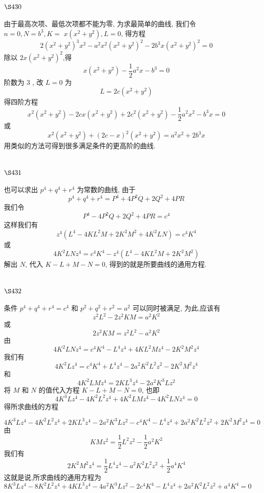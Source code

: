 \section{$\S 430$}

由于最高次项、最低次项都不能为零, 为求最简单的曲线, 我们令 $n=0, N=b^{3}, K=$ $x\left(x^{2}+y^{2}\right), L=0$, 得方程
\[
2\left(x^{2}+y^{2}\right)^{3} x^{2}-a^{2} x^{2}\left(x^{2}+y^{2}\right)^{2}-2 b^{3} x\left(x^{2}+y^{2}\right)^{2}=0
\]
除以 $2 x\left(x^{2}+y^{2}\right)^{2}$,得
\[
x\left(x^{2}+y^{2}\right)-\frac{1}{2} a^{2} x-b^{3}=0
\]
阶数为 3 , 改 $L=0$ 为
\[
L=2 c\left(x^{2}+y^{2}\right)
\]
得四阶方程
\[
x^{2}\left(x^{2}+y^{2}\right)-2 c x\left(x^{2}+y^{2}\right)+2 c^{2}\left(x^{2}+y^{2}\right)-\frac{1}{2} a^{2} x^{2}-b^{3} x=0
\]
或
\[
x^{2}\left(x^{2}+y^{2}\right)+(2 c-x)^{2}\left(x^{2}+y^{2}\right)=a^{2} x^{2}+2 b^{3} x
\]
用类似的方法可得到很多满足条件的更高阶的曲线.

\section{$\S 431$}

也可以求出 $p^{4}+q^{4}+r^{4}$ 为常数的曲线, 由于
\[
p^{4}+q^{4}+r^{4}=P^{4}+4 P^{2} Q+2 Q^{2}+4 P R
\]
我们令
\[
P^{4}-4 P^{2} Q+2 Q^{2}+4 P R=c^{4}
\]
这样我们有
\[
z^{4}\left(L^{4}-4 K L^{2} M+2 K^{2} M^{2}+4 K^{2} L N\right)=c^{4} K^{4}
\]
或
\[
4 K^{2} L N z^{4}=c^{4} K^{4}-z^{4}\left(L^{4}-4 K L^{2} M+2 K^{2} M^{2}\right)
\]
解出 $N$, 代入 $K-L+M-N=0$, 得到的就是所要曲线的通用方程.

\section{$\S 432$}

条件 $p^{4}+q^{4}+r^{4}=c^{4}$ 和 $p^{2}+q^{2}+r^{2}=a^{2}$ 可以同时被满足, 为此,应该有 
\[
z^{2} L^{2}-2 z^{2} K M=a^{2} K^{2}
\]
或
\[
2 z^{2} K M=z^{2} L^{2}-a^{2} K^{2}
\]
由
\[
4 K^{2} L N z^{4}=c^{4} K^{4}-L^{4} z^{4}+4 K L^{2} M z^{4}-2 K^{2} M^{2} z^{4}
\]
我们有
\[
4 K^{2} L z^{4}=c^{4} K^{4}+L^{4} z^{4}-2 a^{2} K^{2} L^{2} z^{2}-2 K^{2} M^{2} z^{4}
\]
和
\[
4 K^{2} L M z^{4}=2 K L^{3} z^{4}-2 a^{2} K^{3} L z^{2}
\]
将 $M$ 和 $N$ 的值代入方程 $K-L+M-N=0$, 也即
\[
4 K^{3} L z^{4}-4 K^{2} L^{2} z^{4}+4 K^{2} L M z^{4}-4 K^{2} L N z^{4}=0
\]
得所求曲线的方程

$4 K^{3} L z^{4}-4 K^{2} L^{2} z^{4}+2 K L^{3} z^{4}-2 a^{2} K^{3} L z^{2}-c^{4} K^{4}-L^{4} z^{4}+2 a^{2} K^{2} L^{2} z^{2}+2 K^{2} M^{2} z^{4}=0$ 由
\[
K M z^{2}=\frac{1}{2} L^{2} z^{2}-\frac{1}{2} a^{2} K^{2}
\]
我们有
\[
2 K^{2} M^{2} z^{4}=\frac{1}{2} L^{4} z^{4}-a^{2} K^{2} L^{2} z^{2}+\frac{1}{2} a^{4} K^{4}
\]
这就是说,所求曲线的通用方程为
\[
8 K^{3} L z^{4}-8 K^{2} L^{2} z^{4}+4 K L^{3} z^{4}-4 a^{2} K^{3} L z^{2}-2 c^{4} K^{4}-L^{4} z^{4}+2 a^{2} K^{2} L^{2} z^{2}+a^{4} K^{4}=0
\]
